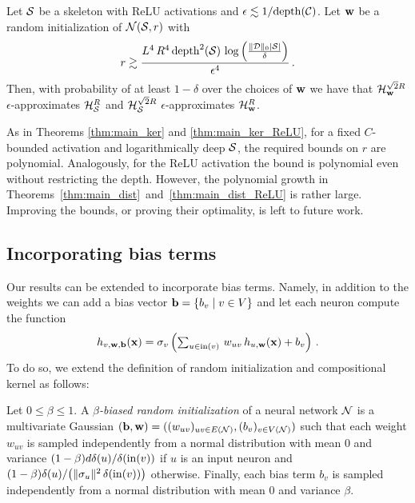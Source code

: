 %
\begin{theorem}\label{thm:main_dist_ReLU}
Let ${\cal S}$ be a skeleton with ReLU activations and
$\epsilon\lesssim {1}/{\mathrm{depth}({\cal C})}$. Let ${\mathbf w}$ be a random initialization of
${\cal N}({\cal S},r)$ with
$$r \gtrsim \frac{L^4 \,R^4\, \mathrm{depth}^2({\cal S})\,
	\log\left(\frac{\|{\cal D}\|_0 |{\cal S}|}{\delta}\right)}{\epsilon^4} \,.
$$ Then, with probability of at least $1-\delta$ over the choices of ${\mathbf w}$ we
have that ${\cal H}_{\mathbf w}^{\sqrt{2}R}$ $\epsilon$-approximates ${\cal H}^R_{\cal S}$ and
${\cal H}_{\cal S}^{\sqrt{2}R}$ $\epsilon$-approximates ${\cal H}^R_{\mathbf w}$.
\end{theorem}
\noindent As in Theorems \ref{thm:main_ker} and \ref{thm:main_ker_ReLU}, for a fixed
$C$-bounded activation and logarithmically deep ${\cal S}$, the required bounds on $r$
are polynomial. Analogously, for the ReLU activation the bound is polynomial
even without restricting the depth. However, the polynomial growth in
Theorems~\ref{thm:main_dist}~and~\ref{thm:main_dist_ReLU} is rather large.
Improving the bounds, or proving their optimality, is left to future work.

\subsection{Incorporating bias terms}
Our results can be extended to incorporate bias terms. Namely, in addition to the weights we can add a bias vector ${\mathbf b} = \{b_v\mid v\in V\}$ and let each neuron compute the function
$$h_{v,{\mathbf w},{\mathbf b}}({\mathbf x}) = \sigma_v\left(\textstyle
	\sum_{u\in \mathrm{in}(v)}\, w_{uv}\,h_{u,{\mathbf w}}({\mathbf x}) + b_v\right)\,.$$
To do so, we extend the definition of random initialization and compositional kernel as follows:

\begin{definition}
%
Let $0\le \beta\le 1$. A {\em $\beta$-biased random initialization} of a neural network ${\cal N}$ is a
multivariate Gaussian $({\mathbf b},{\mathbf w})=((w_{uv})_{uv\in E({\cal N})},(b_v)_{v\in V({\cal N})})$ such that each weight
$w_{uv}$ is sampled independently from a normal distribution with mean $0$
and variance ${(1-\beta)d\delta(u)}/{\delta(\mathrm{in}(v))}$ if $u$ is an input neuron and ${(1-\beta)\delta(u)}/{\left(\|\sigma_{u}\|^2\,\delta(\mathrm{in}(v))\right)}$ otherwise. Finally, each bias term
$b_{v}$ is sampled independently from a normal distribution with mean $0$
and variance $\beta$.
%
\end{definition}



